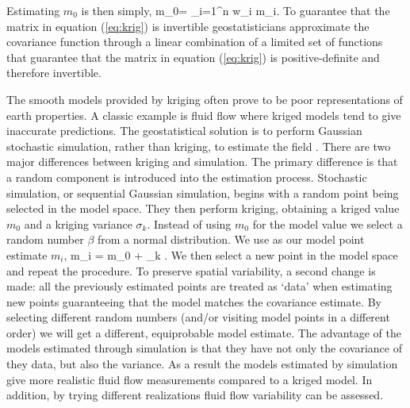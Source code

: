 Estimating $m_0$ is then simply,
\beq
m_0= \sum_{i=1}^{n} w_i m_i.
\eeq
To guarantee that the matrix in equation (\ref{eq:krig})
is invertible geostatisticians approximate
the covariance function
through a linear combination of a limited set of
functions that guarantee that the matrix in equation (\ref{eq:krig}) is
positive-definite and therefore invertible.



The smooth models provided by kriging  often prove
to be poor representations of earth properties.
A classic example is fluid flow where kriged models  tend to give inaccurate
predictions. The geostatistical solution
is to perform Gaussian stochastic simulation, rather than kriging, to
estimate the field \cite{geostat2}.
There are two major  differences between kriging and simulation. 
The primary difference
is that a random component is introduced into the estimation process.   
Stochastic simulation, or  sequential Gaussian simulation, begins
with a random point being selected in the model space.
They then perform kriging, obtaining
a kriged value $m_0$ and  a kriging variance $\sigma_k$.
Instead of using $m_0$ for the model value we
select a  random number $\beta$
from a  normal distribution.
We use as our model point estimate $m_i$,
\beq
m_i = m_0 + \sigma_k \beta.
\eeq
We then select a new point in the model space and repeat the procedure.
To preserve spatial variability,  a second change is made: 
all the previously estimated points are treated as `data' when estimating
new points guaranteeing that the model matches the covariance estimate. 
By selecting different random numbers (and/or visiting model points
in a different order)  we will get a different, equiprobable model
estimate.
The advantage of the models estimated through simulation is that they
have not only the covariance of they data, but also the variance.
As a result the models estimated by simulation
give more realistic fluid flow measurements compared to a kriged model.
In addition, by trying different realizations fluid flow variability
can be assessed.
\par
%
